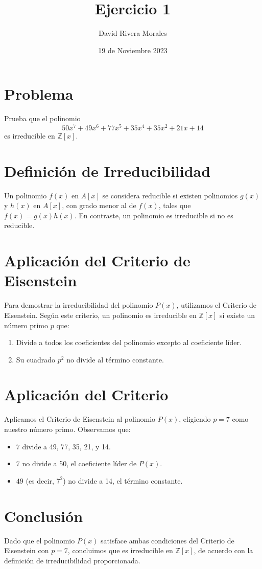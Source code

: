 \documentclass{article}
\title{Ejercicio 1}
\author{David Rivera Morales}
\date{19 de Noviembre 2023}
\begin{document}
\maketitle

\section{Problema}
Prueba que el polinomio
\[ 50x^7 + 49x^6 + 77x^5 + 35x^4 + 35x^2 + 21x + 14 \]
es irreducible en \( \mathbb{Z}[x] \).

\section{Definición de Irreducibilidad}
Un polinomio \( f(x) \) en \( A[x] \) se considera reducible si existen polinomios \( g(x) \) y \( h(x) \) en \( A[x] \), con grado menor al de \( f(x) \), tales que \( f(x) = g(x)h(x) \). En contraste, un polinomio es irreducible si no es reducible.

\section{Aplicación del Criterio de Eisenstein}
Para demostrar la irreducibilidad del polinomio \( P(x) \), utilizamos el Criterio de Eisenstein. Según este criterio, un polinomio es irreducible en \( \mathbb{Z}[x] \) si existe un número primo \( p \) que:

\begin{enumerate}
    \item Divide a todos los coeficientes del polinomio excepto al coeficiente líder.
    \item Su cuadrado \( p^2 \) no divide al término constante.
\end{enumerate}

\section{Aplicación del Criterio}
Aplicamos el Criterio de Eisenstein al polinomio \( P(x) \), eligiendo \( p = 7 \) como nuestro número primo. Observamos que:

\begin{itemize}
    \item \( 7 \) divide a 49, 77, 35, 21, y 14.
    \item \( 7 \) no divide a 50, el coeficiente líder de \( P(x) \).
    \item \( 49 \) (es decir, \( 7^2 \)) no divide a 14, el término constante.
\end{itemize}

\section{Conclusión}
Dado que el polinomio \( P(x) \) satisface ambas condiciones del Criterio de Eisenstein con \( p = 7 \), concluimos que es irreducible en \( \mathbb{Z}[x] \), de acuerdo con la definición de irreducibilidad proporcionada.
\end{document}
